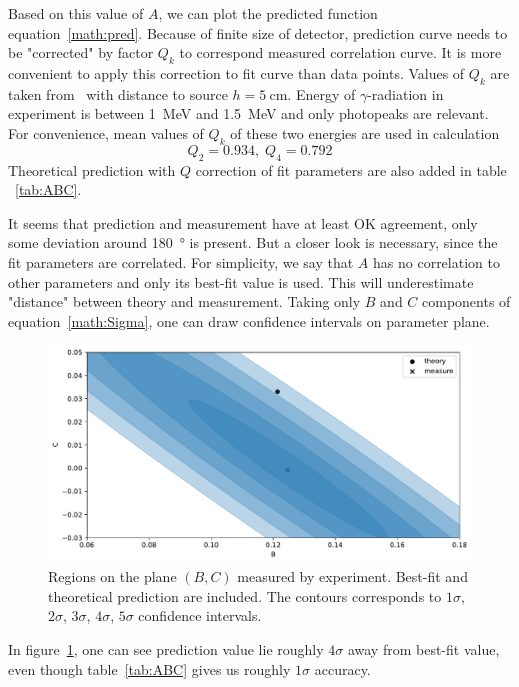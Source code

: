 Based on this value of $A$, we can plot the predicted function equation~\eqref{math:pred}. Because of finite size of detector, prediction curve needs to be "corrected" by factor $Q_k$ to correspond measured correlation curve. It is more convenient to apply this correction to fit curve than data points. Values of $Q_k$ are taken from~\cite{siegbahn} with distance to source $h=\SI{5}{\cm}$. Energy of $\gamma$-radiation in experiment is between \SI{1}{\mega\eV} and \SI{1.5}{\mega\eV} and only photopeaks are relevant. For convenience, mean values of $Q_k$ of these two energies are used in calculation
\begin{equation*}
   Q_2 = \num{0.934},\; Q_4 = \num{0.792}
\end{equation*}
Theoretical prediction with $Q$ correction of fit parameters are also added in table ~\ref{tab:ABC}.

It seems that prediction and measurement have at least OK agreement, only some deviation around \SI{180}{\degree} is present. But a closer look is necessary, since the fit parameters are correlated. For simplicity, we say that $A$ has no correlation to other parameters and only its best-fit value is used. This will underestimate "distance" between theory and measurement. Taking only $B$ and $C$ components of equation~\eqref{math:Sigma}, one can draw confidence intervals on parameter plane.
\begin{figure}[ht]
   \centering
   \includegraphics[width=0.8\linewidth]{./figs/BCpara.pdf}
   \caption{Regions on the plane $(B,C)$ measured by experiment. Best-fit and theoretical prediction are included. The contours corresponds to $1\sigma$, $2\sigma$, $3\sigma$, $4\sigma$, $5\sigma$ confidence intervals. }%
   \label{fig:BCpara}
\end{figure}
In figure~\ref{fig:BCpara}, one can see prediction value lie roughly $4\sigma$ away from best-fit value, even though table~\ref{tab:ABC} gives us roughly $1\sigma$ accuracy.

